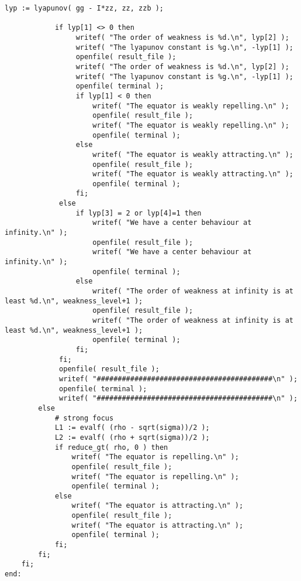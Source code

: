 \documentclass[a4paper,10pt]{article}
\begin{document}
\begin{lstlisting}[name=infinity]
            lyp := lyapunov( gg - I*zz, zz, zzb );

            if lyp[1] <> 0 then
                 writef( "The order of weakness is %d.\n", lyp[2] );
                 writef( "The lyapunov constant is %g.\n", -lyp[1] );
                 openfile( result_file );
                 writef( "The order of weakness is %d.\n", lyp[2] );
                 writef( "The lyapunov constant is %g.\n", -lyp[1] );
                 openfile( terminal );
                 if lyp[1] < 0 then
                     writef( "The equator is weakly repelling.\n" );
                     openfile( result_file );
                     writef( "The equator is weakly repelling.\n" );
                     openfile( terminal );
                 else
                     writef( "The equator is weakly attracting.\n" );
                     openfile( result_file );
                     writef( "The equator is weakly attracting.\n" );
                     openfile( terminal );
                 fi;
             else
                 if lyp[3] = 2 or lyp[4]=1 then
                     writef( "We have a center behaviour at infinity.\n" );
                     openfile( result_file );
                     writef( "We have a center behaviour at infinity.\n" );
                     openfile( terminal );
                 else
                     writef( "The order of weakness at infinity is at least %d.\n", weakness_level+1 );
                     openfile( result_file );
                     writef( "The order of weakness at infinity is at least %d.\n", weakness_level+1 );
                     openfile( terminal );
                 fi;
             fi;
             openfile( result_file );
             writef( "##########################################\n" );
             openfile( terminal );
             writef( "##########################################\n" );
        else
            # strong focus
            L1 := evalf( (rho - sqrt(sigma))/2 );
            L2 := evalf( (rho + sqrt(sigma))/2 );
            if reduce_gt( rho, 0 ) then
                writef( "The equator is repelling.\n" );
                openfile( result_file );
                writef( "The equator is repelling.\n" );
                openfile( terminal );
            else
                writef( "The equator is attracting.\n" );
                openfile( result_file );
                writef( "The equator is attracting.\n" );
                openfile( terminal );
            fi;
        fi;
    fi;
end:
\end{lstlisting}
\end{document}
